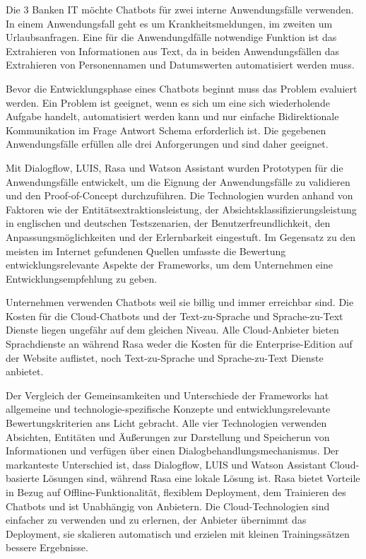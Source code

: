 Die 3 Banken IT möchte Chatbots für zwei interne Anwendungsfälle verwenden.
In einem Anwendungsfall geht es um Krankheitsmeldungen, im zweiten um Urlaubsanfragen.
Eine für die Anwendungdfälle notwendige Funktion ist das Extrahieren von Informationen aus Text, da in beiden Anwendungsfällen das Extrahieren von Personennamen und Datumswerten automatisiert werden muss.

Bevor die Entwicklungsphase eines Chatbots beginnt muss das Problem evaluiert werden.
Ein Problem ist geeignet, wenn es sich um eine sich wiederholende Aufgabe handelt, automatisiert werden kann und nur einfache Bidirektionale Kommunikation im Frage Antwort Schema erforderlich ist.
Die gegebenen Anwendungsfälle erfüllen alle drei Anforgerungen und sind daher geeignet.

Mit Dialogflow, LUIS, Rasa und Watson Assistant wurden Prototypen für die Anwendungsfälle entwickelt, um die Eignung der Anwendungsfälle zu validieren und den Proof-of-Concept durchzuführen.
Die Technologien wurden anhand von Faktoren wie der Entitätsextraktionsleistung, der Absichtsklassifizierungsleistung in englischen und deutschen Testszenarien, der 
Benutzerfreundlichkeit, den Anpassungsmöglichkeiten und der Erlernbarkeit eingestuft.
Im Gegensatz zu den meisten im Internet gefundenen Quellen umfasste die Bewertung entwicklungsrelevante Aspekte der Frameworks, um dem Unternehmen eine Entwicklungsempfehlung zu geben.

Unternehmen verwenden Chatbots weil sie billig und immer erreichbar sind.
Die Kosten für die Cloud-Chatbots und der Text-zu-Sprache und Sprache-zu-Text Dienste liegen ungefähr auf dem gleichen Niveau.
Alle Cloud-Anbieter bieten Sprachdienste an während Rasa weder die Kosten für die Enterprise-Edition auf der Website auflistet, noch Text-zu-Sprache und Sprache-zu-Text Dienste anbietet.

Der Vergleich der Gemeinsamkeiten und Unterschiede der Frameworks hat allgemeine und technologie-spezifische Konzepte und entwicklungsrelevante Bewertungskriterien ans Licht gebracht.
Alle vier Technologien verwenden Absichten, Entitäten und Äußerungen zur Darstellung und Speicherun von Informationen und verfügen über einen Dialogbehandlungsmechanismus.
Der markanteste Unterschied ist, dass Dialogflow, LUIS und Watson Assistant Cloud-basierte Lösungen sind, während Rasa eine lokale Lösung ist.
Rasa bietet Vorteile in Bezug auf Offline-Funktionalität, flexiblem Deployment, dem Trainieren des Chatbots und ist Unabhängig von Anbietern.
Die Cloud-Technologien sind einfacher zu verwenden und zu erlernen, der Anbieter übernimmt das Deployment, sie skalieren automatisch und erzielen mit kleinen Trainingssätzen bessere Ergebnisse.

